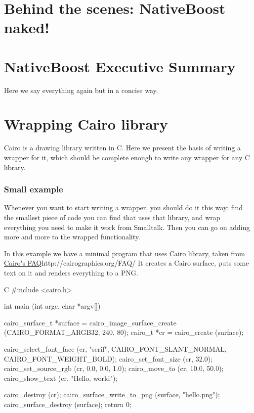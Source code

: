 \documentclass[a4paper,10pt,twoside]{book}
\begin{document}
\section{Behind the scenes: NativeBoost naked!}

\section{NativeBoost Executive Summary}

Here we say everything again but in a concise way. 

\section{Wrapping Cairo library}

Cairo is a drawing library written in C. Here we present the basis of writing a wrapper for it, which should be
complete enough to write any wrapper for any C library.


\subsubsection*{Small example}

Whenever you want to start writing a wrapper, you should do it this way: find the smallest piece of code you can find 
that uses that library, and wrap everything you need to make it work from Smalltalk. Then you can go on adding more and
more to the wrapped functionality. 

In this example we have a minimal program that uses Cairo library, taken from \url{Cairo's FAQ}{http://cairographics.org/FAQ/}
It creates a Cairo surface, puts some text on it
and renders everything to a PNG.

\begin{code}{C}
#include <cairo.h>

int
main (int argc, char *argv[])
{
        cairo_surface_t *surface =
            cairo_image_surface_create (CAIRO_FORMAT_ARGB32, 240, 80);
        cairo_t *cr =
            cairo_create (surface);

        cairo_select_font_face (cr, "serif", CAIRO_FONT_SLANT_NORMAL, CAIRO_FONT_WEIGHT_BOLD);
        cairo_set_font_size (cr, 32.0);
        cairo_set_source_rgb (cr, 0.0, 0.0, 1.0);
        cairo_move_to (cr, 10.0, 50.0);
        cairo_show_text (cr, "Hello, world");

        cairo_destroy (cr);
        cairo_surface_write_to_png (surface, "hello.png");
        cairo_surface_destroy (surface);
        return 0;
}
\end{code}
\end{document}
